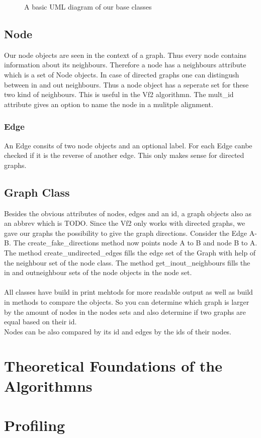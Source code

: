 \documentclass{SeminarV2}
\begin{document}
\begin{figure}
  \caption{A basic UML diagram of our base classes}
\end{figure}
\subsection{Node}
Our node objects are seen in the context of a graph. Thus every node contains information about
its neighbours. Therefore a node has a neighbours attribute which is a set of Node objects.
In case of directed graphs one can distingush between in and out neighbours. Thus a node object has a seperate set for these two kind of neighbours. This is useful in the Vf2 algorithmn. The mult\_id attribute gives an option to name the node in a mulitple alignment.
\subsubsection{Edge}
An Edge consits of two node objects and an optional label. For each Edge canbe checked if it is the reverse of another edge. This only makes sense for directed graphs.
\subsection{Graph Class}
Besides the obvious attributes of nodes, edges and an id, a graph objects also as an
abbrev which is TODO. Since the Vf2 only works with directed graphs, we 
gave our graphs the possibility to give the graph directions. Consider the Edge A-B. The 
create\_fake\_directions method now points node A to B and node B to A.\\
The method create\_undirected\_edges fills the edge set of the Graph with help of the neighbour set of the node class. The method get\_inout\_neighbours fills the in and outneighbour sets of the node objects in the node set.\\\\
All classes have build in print mehtods for more readable output as well as build in 
methods to compare the objects. So you can determine which graph is larger by the amount of 
nodes in the nodes sets and also determine if two graphs are equal based on their id.\\
Nodes can be also compared by its id and edges by the ids of their nodes.
\section{Theoretical Foundations of the Algorithmns}
\section{Profiling}
\end{document}
